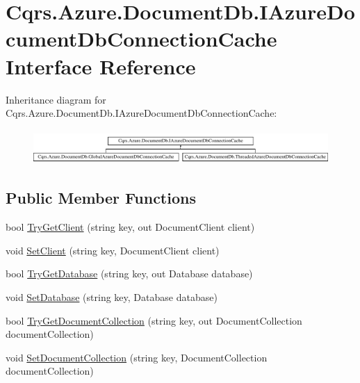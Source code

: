 \hypertarget{interfaceCqrs_1_1Azure_1_1DocumentDb_1_1IAzureDocumentDbConnectionCache}{}\section{Cqrs.\+Azure.\+Document\+Db.\+I\+Azure\+Document\+Db\+Connection\+Cache Interface Reference}
\label{interfaceCqrs_1_1Azure_1_1DocumentDb_1_1IAzureDocumentDbConnectionCache}
Inheritance diagram for Cqrs.\+Azure.\+Document\+Db.\+I\+Azure\+Document\+Db\+Connection\+Cache\+:\begin{figure}[H]
\begin{center}
\leavevmode
\includegraphics[height=1.317647cm]{interfaceCqrs_1_1Azure_1_1DocumentDb_1_1IAzureDocumentDbConnectionCache}
\end{center}
\end{figure}
\subsection*{Public Member Functions}
\begin{DoxyCompactItemize}
\item 
bool \hyperlink{interfaceCqrs_1_1Azure_1_1DocumentDb_1_1IAzureDocumentDbConnectionCache_a56a01a4224cb64d9349913e5237cebda}{Try\+Get\+Client} (string key, out Document\+Client client)
\item 
void \hyperlink{interfaceCqrs_1_1Azure_1_1DocumentDb_1_1IAzureDocumentDbConnectionCache_a38d813e12b632a93a2934e2b1252f409}{Set\+Client} (string key, Document\+Client client)
\item 
bool \hyperlink{interfaceCqrs_1_1Azure_1_1DocumentDb_1_1IAzureDocumentDbConnectionCache_ac2ab3e4a1c093f10d0b55634d4990ab2}{Try\+Get\+Database} (string key, out Database database)
\item 
void \hyperlink{interfaceCqrs_1_1Azure_1_1DocumentDb_1_1IAzureDocumentDbConnectionCache_a9242c99ffb76f8ad9b15cab617056bf0}{Set\+Database} (string key, Database database)
\item 
bool \hyperlink{interfaceCqrs_1_1Azure_1_1DocumentDb_1_1IAzureDocumentDbConnectionCache_af74bf6c8dc009e0179edc20ef3158f03}{Try\+Get\+Document\+Collection} (string key, out Document\+Collection document\+Collection)
\item 
void \hyperlink{interfaceCqrs_1_1Azure_1_1DocumentDb_1_1IAzureDocumentDbConnectionCache_a6f5dab93f2ebee2503eb808b9031777d}{Set\+Document\+Collection} (string key, Document\+Collection document\+Collection)
\end{DoxyCompactItemize}


